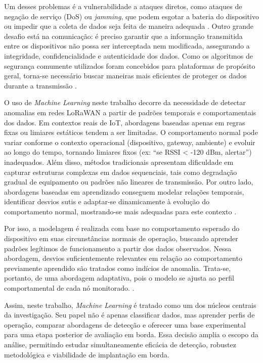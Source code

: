 Um desses problemas é a vulnerabilidade a ataques diretos, como ataques de negação de serviço (DoS) ou \textit{jamming}, que podem esgotar a bateria do dispositivo ou impedir que a coleta de dados seja feita de maneira adequada \cite{hessel2023lorawan}. Outro grande desafio está na comunicação: é preciso garantir que a informação transmitida entre os dispositivos não possa ser interceptada nem modificada, assegurando a integridade, confidencialidade e autenticidade dos dados. Como os algoritmos de segurança comumente utilizados foram concebidos para plataformas de propósito geral, torna-se necessário buscar maneiras mais eficientes de proteger os dados durante a transmissão \cite{nistir8114}.


O uso de \textit{Machine Learning} neste trabalho decorre da necessidade de 
detectar anomalias em redes LoRaWAN a partir de padrões temporais e 
comportamentais dos dados. Em contextos reais de IoT, abordagens baseadas 
apenas em regras fixas ou limiares estáticos tendem a ser limitadas. O 
comportamento normal pode variar conforme o contexto operacional (dispositivo, 
gateway, ambiente) e evoluir ao longo do tempo, tornando limiares fixos 
(ex: ``se RSSI < -120 dBm, alertar'') inadequados. Além disso, métodos 
tradicionais apresentam dificuldade em capturar estruturas complexas em dados 
sequenciais, tais como degradação gradual de equipamento ou padrões não 
lineares de transmissão. Por outro lado, abordagens baseadas em aprendizado 
conseguem modelar relações temporais, identificar desvios sutis e adaptar-se 
dinamicamente à evolução do comportamento normal, mostrando-se mais adequadas 
para este contexto \cite{chalapathy2019}.

Por isso, a modelagem é realizada com base no comportamento esperado do dispositivo em suas circunstâncias normais de operação, buscando aprender padrões legítimos de funcionamento a partir dos dados observados. Nessa abordagem, desvios suficientemente relevantes em relação ao comportamento previamente aprendido são tratados como indícios de anomalia. Trata-se, portanto, de uma abordagem adaptativa, pois o modelo se ajusta ao perfil comportamental de cada nó monitorado. \cite{hayashi2022handsfree}.


Assim, neste trabalho, \textit{Machine Learning} é tratado como um dos núcleos centrais da investigação. Seu papel não é apenas classificar dados, mas aprender perfis de operação, comparar abordagens de detecção e oferecer uma base experimental para uma etapa posterior de avaliação em borda. Essa decisão amplia o escopo da análise, permitindo estudar simultaneamente eficácia de detecção, robustez metodológica e viabilidade de implantação em borda.

